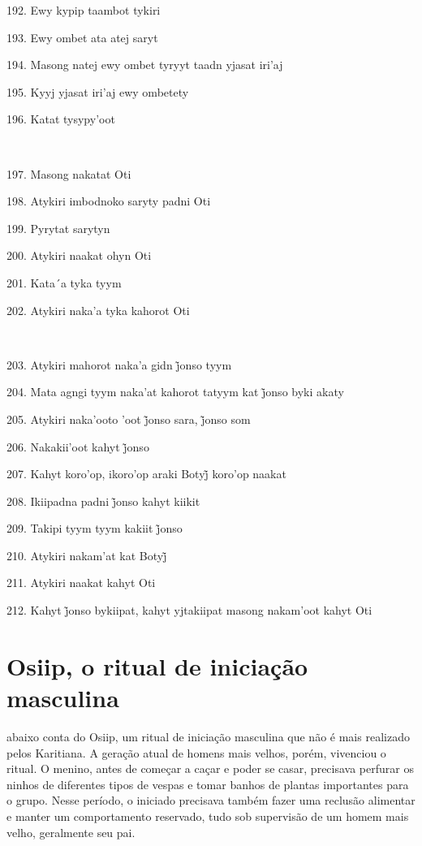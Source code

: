 192. Ewy kypip taambot tykiri

193. Ewy ombet ata atej saryt

194. Masong natej ewy ombet tyryyt taadn yjasat iri'aj

195. Kyyj yjasat iri'aj ewy ombetety

196. Katat tysypy'oot

~

197. Masong nakatat Oti

198. Atykiri imbodnoko saryty padni Oti

199. Pyrytat sarytyn

200. Atykiri naakat ohyn Oti

201. Kata´a tyka tyym

202. Atykiri naka'a tyka kahorot Oti

~

203. Atykiri mahorot naka’a gidn j̃onso tyym

204. Mata agngi tyym naka’at kahorot tatyym kat j̃onso byki akaty

205. Atykiri naka’ooto ’oot j̃onso sara, j̃onso som

206. Nakakii’oot kahyt j̃onso

207. Kahyt koro’op, ikoro’op araki Botyj̃ koro’op naakat

208. Ikiipadna padni j̃onso kahyt kiikit

209. Takipi tyym tyym kakiit j̃onso

210. Atykiri nakam’at kat Botyj̃

211. Atykiri naakat kahyt Oti

212. Kahyt j̃onso bykiipat, kahyt yjtakiipat masong nakam’oot kahyt Oti

\endgroup

\chapter{Osiip, o ritual de iniciação masculina}

 abaixo conta do Osiip, um ritual de iniciação masculina que
não é mais realizado pelos Karitiana. A geração atual de homens mais
velhos, porém, vivenciou o ritual. O menino, antes de começar a caçar e
poder se casar, precisava perfurar os ninhos de diferentes tipos de
vespas e tomar banhos de plantas importantes para o grupo. Nesse
período, o iniciado precisava também fazer uma reclusão alimentar e
manter um comportamento reservado, tudo sob supervisão de um homem mais
velho, geralmente seu pai.

